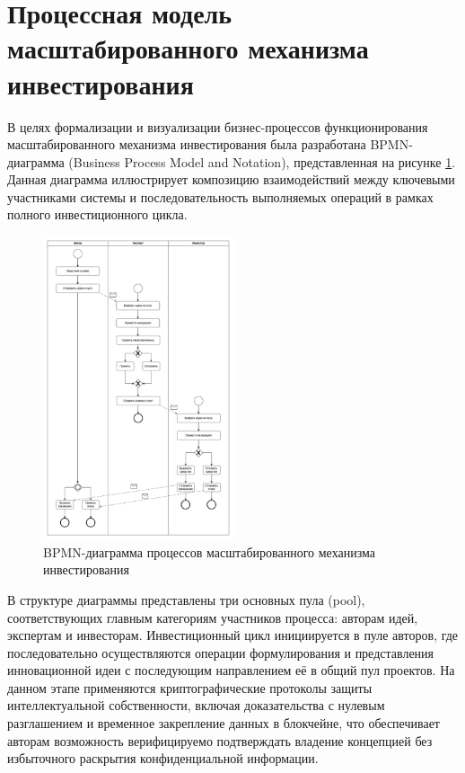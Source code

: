 \documentclass[
    candidate, %
    subf, %
    dotsinheaders=false,
]{disser}
\begin{document}
\section{Процессная модель масштабированного механизма инвестирования}

В целях формализации и визуализации бизнес-процессов функционирования масштабированного механизма инвестирования была разработана BPMN-диаграмма (Business Process Model and Notation), представленная на рисунке \ref{fig:bpmn-diagram}. Данная диаграмма иллюстрирует композицию взаимодействий между ключевыми участниками системы и последовательность выполняемых операций в рамках полного инвестиционного цикла.

\begin{figure}[h]
  \centering
  \includegraphics[width=0.5\textwidth]{./assets/bpmn-diagram.png}
  \caption{BPMN-диаграмма процессов масштабированного механизма инвестирования}
  \label{fig:bpmn-diagram}
\end{figure}

В структуре диаграммы представлены три основных пула (pool), соответствующих главным категориям участников процесса: авторам идей, экспертам и инвесторам. Инвестиционный цикл инициируется в пуле авторов, где последовательно осуществляются операции формулирования и представления инновационной идеи с последующим направлением её в общий пул проектов. На данном этапе применяются криптографические протоколы защиты интеллектуальной собственности, включая доказательства с нулевым разглашением и временное закрепление данных в блокчейне, что обеспечивает авторам возможность верифицируемо подтверждать владение концепцией без избыточного раскрытия конфиденциальной информации.
\end{document}
